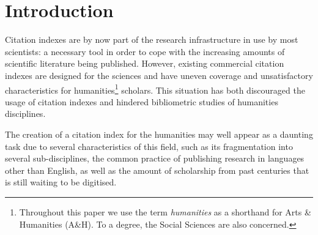 \section{Introduction}\label{sec:introduction}



Citation  indexes  are  by  now  part  of  the  research  infrastructure  in  use  by  most  scientists:  a  necessary  tool  in  order  to  cope  with  the  increasing  amounts  of  scientific  literature  being  published. However, existing commercial  citation  indexes  are  designed  for  the  sciences  and  have  uneven  coverage  and  unsatisfactory  characteristics  for humanities\footnote{Throughout this paper we use the term \textit{humanities} as a shorthand for Arts \& Humanities (A\&H). To a degree, the Social Sciences are also concerned.} scholars. This situation has both discouraged the usage of citation indexes and hindered bibliometric studies of humanities disciplines.  

The creation of a citation index for the humanities may well appear as a daunting task due to several characteristics of this field, such as its fragmentation into several sub-disciplines, the common practice of publishing research in languages other than English, as well as the amount of scholarship from past centuries that is still waiting to be digitised.

